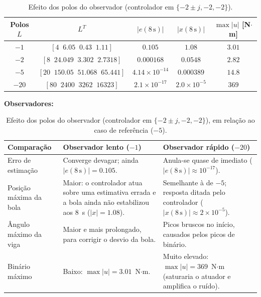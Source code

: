 \documentclass[12pt]{report}
\begin{document}
\begin{table}[H]\centering
\caption{Efeito dos polos do observador (controlador em $\{-2\pm j,-2,-2\}$).}
\label{tab:polosL}
\begin{tabular}{ccccc}\hline
Polos $L$ & $L^T$ & $|e(8\,\text{s})|$ & $|x(8\,\text{s})|$ & $\max|u|$ [N$\cdot$m]\\\hline
$-1$  & $[4\;\;6.05\;\;0.43\;\;1.11]$        & $0.105$             & $1.08$               & $3.01$\\
$-2$  & $[8\;\;24.049\;\;3.302\;\;2.7318]$   & $0.000168$          & $0.0548$             & $2.82$\\
$-5$  & $[20\;\;150.05\;\;51.068\;\;65.441]$ & $4.14\times10^{-14}$& $0.000389$           & $14.8$\\
$-20$ & $[80\;\;2400\;\;3262\;\;16323]$      & $2.1\times10^{-17}$ & $2.0\times10^{-5}$   & $369$\\\hline
\end{tabular}
\end{table}

\textbf{Observadores:}
\begin{table}[H]\centering
\caption{Efeito dos polos do observador (controlador em $\{-2\pm j,-2,-2\}$), em relação ao caso de referência ($-5$).}
\label{tab:polosL}
\small
\begin{tabularx}{\textwidth}{p{2.7cm}XX}\hline
Comparação & Observador lento ($-1$) & Observador rápido ($-20$)\\\hline

Erro de estimação &
Converge devagar; ainda $|e(8\,\text{s})|=0.105$. &
Anula-se quase de imediato ($|e(8\,\text{s})|\approx10^{-17}$). \\[2pt]

Posição máxima da bola &
Maior: o controlador atua sobre uma estimativa errada e a bola ainda não estabilizou aos 8~s ($|x|=1.08$). &
Semelhante à de $-5$; resposta ditada pelo controlador ($|x(8\,\text{s})|\approx2\times10^{-5}$). \\[2pt]

Ângulo máximo da viga &
Maior e mais prolongado, para corrigir o desvio da bola. &
Picos bruscos no início, causados pelos picos de binário. \\[2pt]

Binário máximo &
Baixo: $\max|u|=3.01$~N$\cdot$m. &
Muito elevado: $\max|u|=369$~N$\cdot$m (saturaria o atuador e amplifica o ruído). \\\hline
\end{tabularx}
\end{table}
\end{document}
